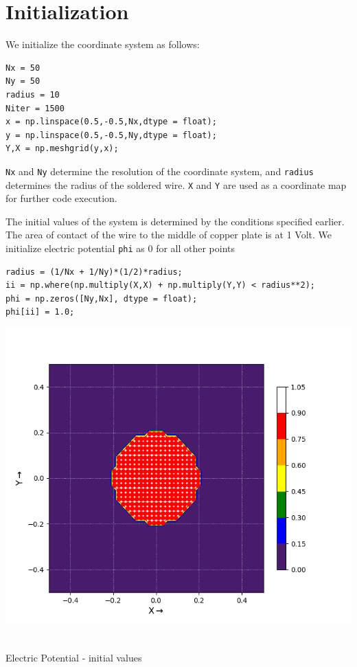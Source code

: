 \documentclass[12pt, a4paper]{report}
\begin{document}
\section*{Initialization}

We initialize the coordinate system as follows:
\begin{verbatim}
Nx = 50                 
Ny = 50
radius = 10
Niter = 1500
x = np.linspace(0.5,-0.5,Nx,dtype = float);
y = np.linspace(0.5,-0.5,Ny,dtype = float);
Y,X = np.meshgrid(y,x);
\end{verbatim}
\texttt{Nx} and \texttt{Ny} determine the resolution of the coordinate system, and \texttt{radius} determines the radius of the soldered wire. \texttt{X} and \texttt{Y} are used as a coordinate map for further code execution. 

The initial values of the system is determined by the conditions specified earlier. The area of contact of the wire to the middle of copper plate is at 1 Volt. We initialize electric potential \texttt{phi} as $0$ for all other points

\begin{verbatim}
radius = (1/Nx + 1/Ny)*(1/2)*radius;
ii = np.where(np.multiply(X,X) + np.multiply(Y,Y) < radius**2);
phi = np.zeros([Ny,Nx], dtype = float);
phi[ii] = 1.0;
\end{verbatim}

\begin{center}
	\includegraphics[scale=0.60]{Figure2} 
	\caption{\\Electric Potential - initial values}
	\label{fig:rawdata}
\end{center}
\end{document}
